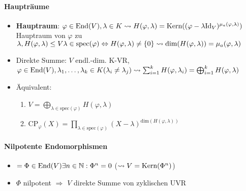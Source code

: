 \paragraph{Haupträume}
\begin{itemize}
  \item \textbf{Hauptraum}: $\varphi \in \text{End}(V), \lambda \in K \leadsto H(\varphi, \lambda) \\* = \text{Kern}((\varphi - \lambda \text{Id}_V)^{\mu_a(\varphi, \lambda)})$ Hauptraum von $\varphi$ zu $\lambda, H(\varphi, \lambda) \leq V \\* \lambda \in \text{spec}(\varphi) \Leftrightarrow H(\varphi, \lambda) \neq \{ 0 \} \\* \leadsto \text{dim}(H(\varphi, \lambda)) = \mu_a(\varphi, \lambda)$
  \item Direkte Summe: $V$ endl.-dim. K-VR, $\varphi \in \text{End}(V), \lambda_1,\dots,\lambda_k \in K (\lambda_i \neq \lambda_j) \\* \leadsto \sum_{i=1}^k H(\varphi, \lambda_i) = \bigoplus_{i=1}^k H(\varphi, \lambda)$
  \item Äquivalent:
  \begin{enumerate}
    \item $V = \bigoplus_{\lambda \in \text{spec}(\varphi)} H(\varphi, \lambda)$
    \item $\text{CP}_\varphi(X)=\prod_{\lambda \in \text{spec}(\varphi)} (X - \lambda)^{\text{dim}(H(\varphi, \lambda))}$
  \end{enumerate}
\end{itemize}

\paragraph{Nilpotente Endomorphismen}
\begin{itemize}
  \item \( = \Phi \in \text{End}(V) \exists n \in \mathbb{N}: \Phi^n = 0 \) (\( \leadsto V = \text{Kern}(\Phi^n) \))
  \item \( \Phi \) nilpotent \( \Rightarrow \) \( V \) direkte Summe von zyklischen UVR
\end{itemize}

